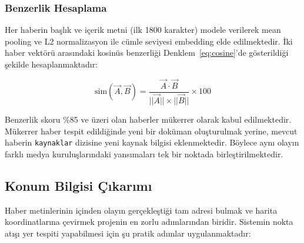 \documentclass[conference]{IEEEtran}
\begin{document}
    \subsubsection{Benzerlik Hesaplama}
    Her haberin ba{\c s}l{\i}k ve i{\c c}erik metni (ilk 1800 karakter) modele verilerek mean pooling ve L2 normalizasyon ile c{\"u}mle seviyesi embedding elde edilmektedir. {\.I}ki haber vekt{\"o}r{\"u} aras{\i}ndaki kosin{\"u}s benzerli{\u g}i Denklem~\ref{eq:cosine}'de g{\"o}sterildi{\u g}i {\c s}ekilde hesaplanmaktad{\i}r:

    \begin{equation}
        \label{eq:cosine}
        \text{sim}(\vec{A}, \vec{B}) = \frac{\vec{A} \cdot \vec{B}}{||\vec{A}|| \times ||\vec{B}||} \times 100
    \end{equation}

    Benzerlik skoru \%85 ve {\"u}zeri olan haberler m{\"u}kerrer olarak kabul edilmektedir. M{\"u}kerrer haber tespit edildi{\u g}inde yeni bir dok{\"u}man olu{\c s}turulmak yerine, mevcut haberin \texttt{kaynaklar} dizisine yeni kaynak bilgisi eklenmektedir. B{\"o}ylece ayn{\i} olay{\i}n farkl{\i} medya kurulu{\c s}lar{\i}ndaki yans{\i}malar{\i} tek bir noktada birle{\c s}tirilmektedir.

    \subsection{Konum Bilgisi {\c C}{\i}kar{\i}m{\i}}
    Haber metinlerinin içinden olayın gerçekleştiği tam adresi bulmak ve harita koordinatlarına çevirmek projenin en zorlu adımlarından biridir. Sistemin nokta atışı yer tespiti yapabilmesi için şu pratik adımlar uygulanmaktadır:
\end{document}
